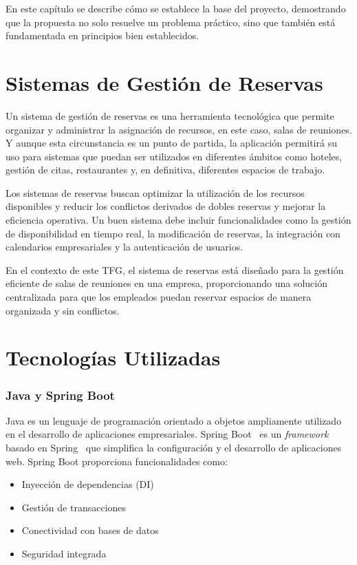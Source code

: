 
En este capítulo se describe cómo se establece la base del proyecto, demostrando que la propuesta no solo resuelve un problema práctico, sino que también está fundamentada en principios bien establecidos.

\section{Sistemas de Gestión de Reservas}

Un sistema de gestión de reservas es una herramienta tecnológica que permite organizar y administrar la asignación de recursos, en este caso, salas de reuniones. Y aunque esta circunstancia es un punto de partida, la aplicación permitirá su uso para sistemas que puedan ser utilizados en diferentes ámbitos como hoteles, gestión de citas, restaurantes y, en definitiva, diferentes espacios de trabajo.

Los sistemas de reservas buscan optimizar la utilización de los recursos disponibles y reducir los conflictos derivados de dobles reservas y mejorar la eficiencia operativa. Un buen sistema debe incluir funcionalidades como la gestión de disponibilidad en tiempo real, la modificación de reservas, la integración con calendarios empresariales y la autenticación de usuarios.

En el contexto de este TFG, el sistema de reservas está diseñado para la gestión eficiente de salas de reuniones en una empresa, proporcionando una solución centralizada para que los empleados puedan reservar espacios de manera organizada y sin conflictos.

\section{Tecnologías Utilizadas}
\subsubsection{Java y Spring Boot}
Java es un lenguaje de programación orientado a objetos ampliamente utilizado en el desarrollo de aplicaciones empresariales. Spring Boot~\cite{spring-boot} es un \emph{framework}~\cite{framework} basado en Spring~\cite{spring} que simplifica la configuración y el desarrollo de aplicaciones web.
Spring Boot proporciona funcionalidades como:
\begin{itemize}
\tightlist
\item
Inyección de dependencias (DI)
\item
Gestión de transacciones
\item
Conectividad con bases de datos
\item
Seguridad integrada
\end{itemize}

